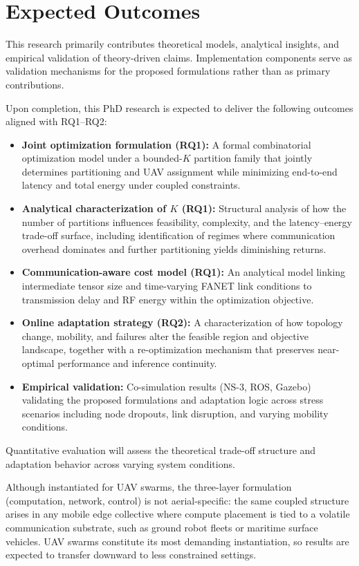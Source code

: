 \section*{Expected Outcomes}
This research primarily contributes theoretical models, analytical insights, and empirical validation of theory-driven claims. Implementation components serve as validation mechanisms for the proposed formulations rather than as primary contributions.

Upon completion, this PhD research is expected to deliver the following outcomes aligned with RQ1--RQ2:
\begin{itemize}
  \item \textbf{Joint optimization formulation (RQ1):} A formal combinatorial optimization model under a bounded-$K$ partition family that jointly determines partitioning and UAV assignment while minimizing end-to-end latency and total energy under coupled constraints.

  \item \textbf{Analytical characterization of $K$ (RQ1):} Structural analysis of how the number of partitions influences feasibility, complexity, and the latency--energy trade-off surface, including identification of regimes where communication overhead dominates and further partitioning yields diminishing returns.

  \item \textbf{Communication-aware cost model (RQ1):} An analytical model linking intermediate tensor size and time-varying FANET link conditions to transmission delay and RF energy within the optimization objective.

  \item \textbf{Online adaptation strategy (RQ2):} A characterization of how topology change, mobility, and failures alter the feasible region and objective landscape, together with a re-optimization mechanism that preserves near-optimal performance and inference continuity.

  \item \textbf{Empirical validation:} Co-simulation results (NS-3, ROS, Gazebo) validating the proposed formulations and adaptation logic across stress scenarios including node dropouts, link disruption, and varying mobility conditions.
\end{itemize}

Quantitative evaluation will assess the theoretical trade-off structure and adaptation behavior across varying system conditions.

Although instantiated for UAV swarms, the three-layer formulation (computation, network, control) is not aerial-specific: the same coupled structure arises in any mobile edge collective where compute placement is tied to a volatile communication substrate, such as ground robot fleets or maritime surface vehicles. UAV swarms constitute its most demanding instantiation, so results are expected to transfer downward to less constrained settings.
